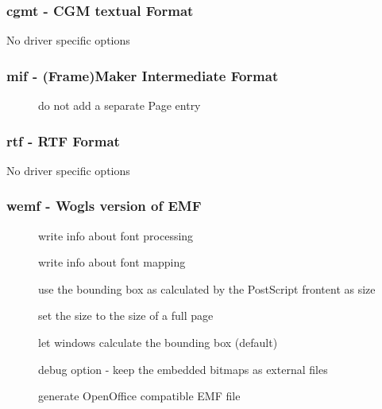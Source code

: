 \documentclass[english,a4paper]{article}
\begin{document}
\subsubsection{cgmt - CGM textual Format}
No driver specific options
\subsubsection{mif - (Frame)Maker Intermediate Format}
\begin{description}
\item[] 
do not add a separate Page entry


\end{description}
\subsubsection{rtf - RTF Format}
No driver specific options
\subsubsection{wemf - Wogls version of EMF }
\begin{description}
\item[] 
write info about font processing


\item[] 
write info about font mapping


\item[] 
use the bounding box as calculated by the PostScript frontent as size


\item[] 
set the size to the size of a full page


\item[] 
let windows calculate the bounding box (default)


\item[] 
debug option - keep the embedded bitmaps as external files 


\item[] 
generate OpenOffice compatible EMF file


\end{description}
\end{document}
